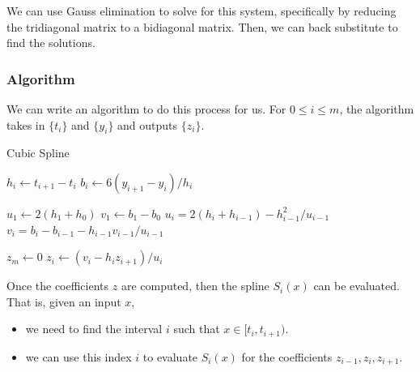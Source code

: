 \documentclass[letterpaper]{article}
\begin{document}
We can use Gauss elimination to solve for this system, specifically by reducing the tridiagonal matrix to a bidiagonal matrix. Then, we can back substitute to find the solutions. 

\subsubsection{Algorithm}
We can write an algorithm to do this process for us. For $0 \leq i \leq m$, the algorithm takes in $\{t_i\}$ and $\{y_i\}$ and outputs $\{z_i\}$. 
\begin{algorithm}[H]
    \caption{Cubic Spline}
    \begin{algorithmic}[1]
                \State $h_i \gets t_{i + 1} - t_i$ 
                \State $b_i \gets 6(y_{i + 1} - y_i) / h_i$
            \EndFor 

            \State $u_1 \gets 2(h_1 + h_0)$
            \State $v_1 \gets b_1 - b_0$
                \State $u_i = 2(h_i + h_{i - 1}) - h_{i - 1}^2 / u_{i - 1}$ 
                \State $v_i = b_i - b_{i - 1} - h_{i - 1} v_{i - 1} / u_{i - 1}$
            \EndFor 

            \State $z_m \gets 0$
                \State $z_i \gets (v_i - h_i z_{i + 1}) / u_i$ 
            \EndFor 
        \EndFunction 
    \end{algorithmic}
\end{algorithm}
Once the coefficients $z$ are computed, then the spline $S_i (x)$ can be evaluated. That is, given an input $x$,
\begin{itemize}
    \item we need to find the interval $i$ such that $x \in [t_i, t_{i + 1})$. 
    \item we can use this index $i$ to evaluate $S_{i}(x)$  for the coefficients $z_{i - 1}, z_i, z_{i + 1}$.
\end{itemize}
\end{document}
